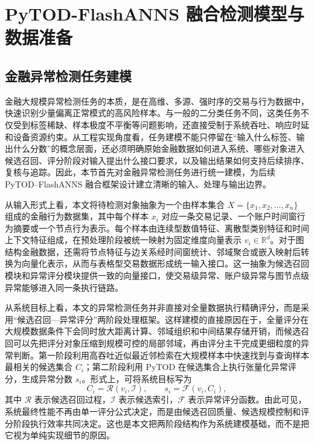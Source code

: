 
\chapter{PyTOD-FlashANNS 融合检测模型与数据准备}

\section{金融异常检测任务建模}

金融大规模异常检测任务的本质，是在高维、多源、强时序的交易与行为数据中，快速识别少量偏离正常模式的高风险样本。与一般的二分类任务不同，这类任务不仅受到标签稀缺、样本极度不平衡等问题影响，还直接受制于系统吞吐、响应时延和设备资源约束。从工程实现角度看，任务建模不能只停留在“输入什么标签、输出什么分数”的概念层面，还必须明确原始金融数据如何进入系统、哪些对象进入候选召回、评分阶段对输入提出什么接口要求，以及输出结果如何支持后续排序、复核与追踪。因此，本节首先对金融异常检测任务进行统一建模，为后续 PyTOD--FlashANNS 融合框架设计建立清晰的输入、处理与输出边界。

从输入形式上看，本文将待检测对象抽象为一个由样本集合 $X=\{x_1,x_2,\ldots,x_n\}$ 组成的金融行为数据集，其中每个样本 $x_i$ 对应一条交易记录、一个账户时间窗行为摘要或一个节点行为表示。每个样本由连续型数值特征、离散型类别特征和时间上下文特征组成，在预处理阶段被统一映射为固定维度向量表示 $v_i\in\mathbb{R}^d$。对于图结构金融数据，还需将节点特征与边关系经时间窗统计、邻域聚合或嵌入映射后转换为向量化表示，从而与表格型交易数据形成统一输入接口\citep{dgraphfin_paper}。这一抽象为候选召回模块和异常评分模块提供一致的向量接口，使交易级异常、账户级异常与图节点级异常能够进入同一条执行链路。

从系统目标上看，本文的异常检测任务并非直接对全量数据执行精确评分，而是采用``候选召回---异常评分''两阶段处理框架。这样建模的直接原因在于，全量评分在大规模数据条件下会同时放大距离计算、邻域组织和中间结果存储开销，而候选召回可以先把评分对象压缩到规模可控的局部邻域，再由评分主干完成更细粒度的异常判断。第一阶段利用高吞吐近似最近邻检索在大规模样本中快速找到与查询样本最相关的候选集合 $C_i$；第二阶段利用 PyTOD 在候选集合上执行张量化异常评分，生成异常分数 $s_i$。形式上，可将系统目标写为
\begin{equation}
  C_i = \mathcal{R}(v_i, \mathcal{I}), \qquad s_i = \mathcal{F}(v_i, C_i),
\end{equation}
其中 $\mathcal{R}$ 表示候选召回过程，$\mathcal{I}$ 表示候选索引，$\mathcal{F}$ 表示异常评分函数。由此可见，系统最终性能不再由单一评分公式决定，而是由候选召回质量、候选规模控制和评分阶段执行效率共同决定。这也是本文把两阶段结构作为系统建模基础，而不是把它视为单纯实现细节的原因\citep{zhao2022tod}。

